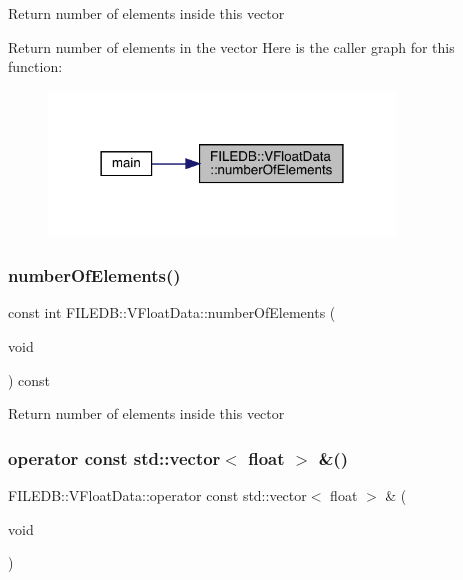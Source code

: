 Return number of elements inside this vector

Return number of elements in the vector Here is the caller graph for this function\+:
\nopagebreak
\begin{figure}[H]
\begin{center}
\leavevmode
\includegraphics[width=261pt]{d3/d37/classFILEDB_1_1VFloatData_a1ef52e51516fd02fa123199c63cef647_icgraph}
\end{center}
\end{figure}
\mbox{\label{classFILEDB_1_1VFloatData_a1ef52e51516fd02fa123199c63cef647}} 
\subsubsection{\texorpdfstring{numberOfElements()}{numberOfElements()}\hspace{0.1cm}{\footnotesize\ttfamily [2/2]}}
{\footnotesize\ttfamily const int F\+I\+L\+E\+D\+B\+::\+V\+Float\+Data\+::number\+Of\+Elements (\begin{DoxyParamCaption}\item[{void}]{ }\end{DoxyParamCaption}) const}

Return number of elements inside this vector \mbox{\label{classFILEDB_1_1VFloatData_a9ac82e245522972ecb6667ec078336b5}} 
\subsubsection{\texorpdfstring{operator const std::vector$<$ float $>$ \&()}{operator const std::vector< float > \&()}\hspace{0.1cm}{\footnotesize\ttfamily [1/2]}}
{\footnotesize\ttfamily F\+I\+L\+E\+D\+B\+::\+V\+Float\+Data\+::operator const std\+::vector$<$ float $>$ \& (\begin{DoxyParamCaption}\item[{void}]{ }\end{DoxyParamCaption})}

